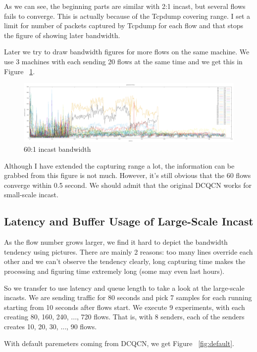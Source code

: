 \documentclass[12pt,a4paper]{article}
\begin{document}
As we can see, the beginning parts are similar with 2:1 incast, but several flows fails to converge.
This is actually because of the Tcpdump covering range.
I set a limit for number of packets captured by Tcpdump for each flow and that stops the figure of showing later bandwidth.

Later we try to draw bandwidth figures for more flows on the same machine.
We use 3 machines with each sending 20 flows at the same time and we get this in Figure ~\ref{fig:3_20_0}.

\begin{figure}[ht]
	\begin{center}
		\includegraphics[width=6in]{3_20_0}
		\caption{60:1 incast bandwidth}
		\label{fig:3_20_0}
	\end{center}
\end{figure}

Although I have extended the capturing range a lot, the information can be grabbed from this figure is not much.
However, it's still obvious that the 60 flows converge within 0.5 second.
We should admit that the original DCQCN works for small-scale incast.

\subsection{Latency and Buffer Usage of Large-Scale Incast}
As the flow number grows larger, we find it hard to depict the bandwidth tendency using pictures.
There are mainly 2 reasons: too many lines override each other and we can't observe the tendency clearly, 
long capturing time makes the processing and figuring time extremely long (some may even last hours).

So we transfer to use latency and queue length to take a look at the large-scale incasts.
We are sending traffic for 80 seconds and pick 7 samples for each running starting from 10 seconds after flows start.
We execute 9 experiments, with each creating 80, 160, 240, ..., 720 flows.
That is, with 8 senders, each of the senders creates 10, 20, 30, ..., 90 flows.

With default paremeters coming from DCQCN, we get Figure ~\ref{fig:default}.
\end{document}
